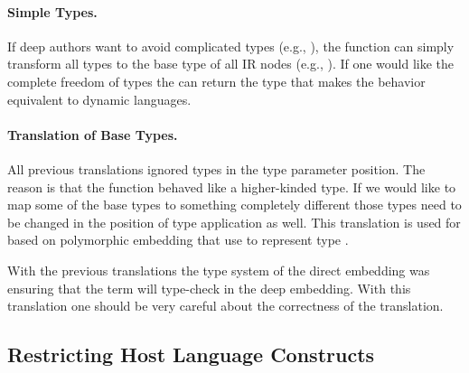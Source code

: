 \documentclass[paper.tex]{subfiles}
\begin{document}
\lstset{mathescape=false}
\lstset{mathescape=true}

\paragraph{Simple Types.} If deep \edsl authors want to avoid complicated types (e.g., ), the  function can simply transform all types to the base type of all IR nodes (e.g., ). If one would like the complete freedom of types the  can return the  type \cite{abadi_dynamic_1991} that makes the behavior equivalent to dynamic languages.

\paragraph{Translation of Base Types.} All previous translations ignored types in the type parameter position. The reason is that the  function behaved like a higher-kinded type. If we would like to map some of the base types to something completely different those types need to be changed in the position of type application as well. This translation is used for \edsls based on polymorphic embedding \cite{hofer_polymorphic_2008} that use  to represent type .

With the previous translations the type system of the direct embedding was ensuring that the term will type-check in the deep embedding. With this translation one should be very careful about the correctness of the translation.

\subsection{Restricting Host Language Constructs}
\label{sec:restricting}
\end{document}
